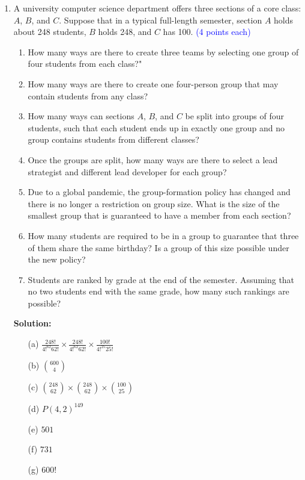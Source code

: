 \documentclass{article}
\newcommand{\pte}[1]{\textcolor{blue}{(#1 points each)}}
\newenvironment{solution}
{
\par
\color{blue}
\textbf{Solution:}
}
{
\par
}
\begin{document}
\begin{enumerate}
\item A university computer science department offers three sections of a core class: $A$, $B$, and $C$. Suppose that in a typical full-length semester, section $A$ holds about 248 students, $B$ holds 248, and $C$ has 100. \pte{4}
\begin{enumerate}
    \item How many ways are there to create three teams by selecting one group of four students from each class?"
    \item How many ways are there to create one four-person group that may contain students from any class?
    \item How many ways can sections $A$, $B$, and $C$ be split into groups of four students, such that each student ends up in exactly one group and no group contains students from different classes?
    \item Once the groups are split, how many ways are there to select a lead strategist and different lead developer for each group?
    \item Due to a global pandemic, the group-formation policy has changed and there is no longer a restriction on group size. What is the size of the smallest group that is guaranteed to have a member from each section?
    \item How many students are required to be in a group to guarantee that three of them share the same birthday? Is a group of this size possible under the new policy?
    \item Students are ranked by grade at the end of the semester. Assuming that no two students end with the same grade, how many such rankings are possible?
\end{enumerate}

\begin{solution}
\begin{enumerate}
    \item[(a)] $\frac{248!}{4!^{62}62!} \times \frac{248!}{4!^{62}62!} \times \frac{100!}{4!^{25}25!}$
    \item[(b)] ${600 \choose 4}$
    \item[(c)] ${248 \choose 62} \times {248 \choose 62} \times {100 \choose 25}$
    \item[(d)] $P(4,2)^{149}$
    \item[(e)] $501$
    \item[(f)] $731$
    \item[(g)] $600!$
\end{enumerate}
\end{solution}



\end{enumerate}
\end{document}
